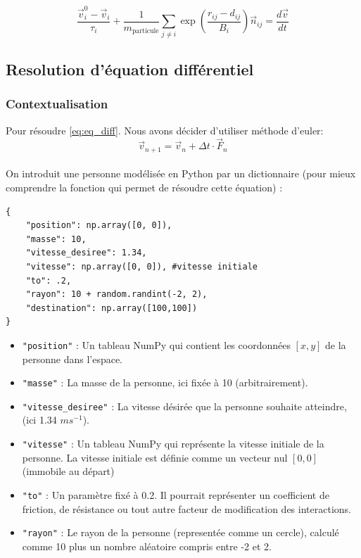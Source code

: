 \documentclass[a4paper,12pt]{article}
\begin{document}
\begin{equation}
\label{eq:eq_diff}
\frac{\vec{v}_i^0 - \vec{v}_i}{\tau_i} + \frac{1}{m_{\text{particule}}} \sum_{j \neq i}  \exp\left( \frac{r_{ij} - d_{ij}}{B_i} \right) \vec{n}_{ij} = \frac{d\vec{v}}{dt}
\end{equation}

\subsection{Resolution d'équation différentiel}
\subsubsection{Contextualisation}

\indent Pour résoudre \eqref{eq:eq_diff}. Nous avons décider d'utiliser méthode d'euler:
\[
\vec{v}_{n+1} = \vec{v}_n + \Delta t \cdot \vec{F}_n
\]
\\ On introduit une personne modélisée en Python par un dictionnaire (pour mieux comprendre  la fonction qui permet de résoudre cette équation) :

\begin{verbatim}
{
	"position": np.array([0, 0]),
	"masse": 10,
	"vitesse_desiree": 1.34, 
	"vitesse": np.array([0, 0]), #vitesse initiale
	"to": .2,
	"rayon": 10 + random.randint(-2, 2),
	"destination": np.array([100,100])
} 
\end{verbatim}

\begin{itemize}
    \item \texttt{"position"} : Un tableau NumPy qui contient les coordonnées \([x, y]\) de la personne dans l'espace. 
    
    \item \texttt{"masse"} : La masse de la personne, ici fixée à 10 (arbitrairement).
    
    \item \texttt{"vitesse\_desiree"} : La vitesse désirée que la personne souhaite atteindre, (ici 1.34 $ms^{-1}$).
    
    \item \texttt{"vitesse"} : Un tableau NumPy qui représente la vitesse initiale de la personne. La vitesse initiale est définie comme un vecteur nul \([0, 0]\) (immobile au départ)
    
    \item \texttt{"to"} : Un paramètre fixé à 0.2. Il pourrait représenter un coefficient de friction, de résistance ou tout autre facteur de modification des interactions.
    
    \item \texttt{"rayon"} : Le rayon de la personne (representée comme un cercle), calculé comme 10 plus un nombre aléatoire compris entre -2 et 2. 
\end{itemize}
\end{document}
